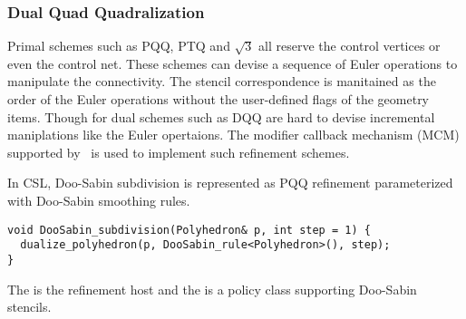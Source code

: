 \subsubsection{Dual Quad Quadralization}
Primal schemes such as PQQ, PTQ and $\sqrt{3}$
all reserve the control vertices or even the control net.
These schemes can devise a sequence of Euler operations
to manipulate the connectivity. The stencil correspondence 
is manitained as the order of the Euler operations without
the user-defined flags of the geometry items. Though for 
dual schemes such as DQQ are hard to devise incremental
maniplations like the Euler opertaions. The modifier callback 
mechanism (MCM) supported by \cgalpoly\ is used to implement
such refinement schemes.

In CSL, Doo-Sabin subdivision is represented as 
PQQ refinement parameterized with Doo-Sabin smoothing
rules.
\begin{lstlisting}
void DooSabin_subdivision(Polyhedron& p, int step = 1) {
  dualize_polyhedron(p, DooSabin_rule<Polyhedron>(), step);
}
\end{lstlisting}
The  is the refinement host and the
 is a policy class supporting 
Doo-Sabin stencils.
\\

